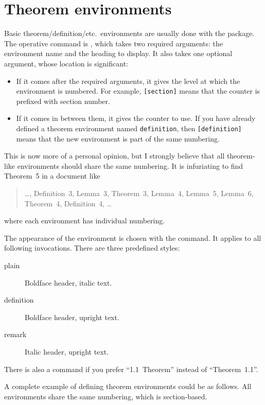 %
%
%
\section{Theorem environments}\label{sec:amsthm}

Basic theorem/definition/etc.\ environments are usually done with the  package.
The operative command is , which takes two required arguments:
the environment name and the heading to display.
It also takes one optional argument, whose location is significant:
\begin{itemize}
\item If it comes after the required arguments,
    it gives the level at which the environment is numbered.
    For example, \verb|[section]| means that the counter is prefixed with section number.
\item If it comes in between them, it gives the counter to use.
    If you have already defined a theorem environment named \verb|definition|,
    then \verb|[definition]| means that the new environment is part of the same numbering.
\end{itemize}

\begin{practices}
This is now more of a personal opinion,
but I strongly believe that all theorem-like environments should share the same numbering.
It is infuriating to find Theorem~5 in a document like
\begin{quote}
    \dots, Definition~3, Lemma~3, Theorem~3, Lemma~4, Lemma~5, Lemma~6, Theorem~4,
    Definition~4, \dots
\end{quote}
where each environment has individual numbering.
\end{practices}

The appearance of the environment is chosen with the  command.
It applies to all following  invocations.
There are three predefined styles:
\begin{description}
\item[plain] Boldface header, italic text.
\item[definition] Boldface header, upright text.
\item[remark] Italic header, upright text.
\end{description}
%
There is also a  command if you prefer ``1.1~Theorem'' instead of ``Theorem~1.1''.

A complete example of defining theorem environments could be as follows.
All environments share the same numbering, which is section-based.
%
\begin{ExampleCode}
\theoremstyle{plain}
\newtheorem{theorem}{Theorem}[section]
\newtheorem{lemma}[theorem]{Lemma}
\newtheorem{corollary}[theorem]{Corollary}

\theoremstyle{remark}
\newtheorem{remark}[theorem]{Remark}
\newtheorem{example}[theorem]{Example}

\theoremstyle{definition}
\newtheorem{definition}[theorem]{Definition}
\end{ExampleCode}

